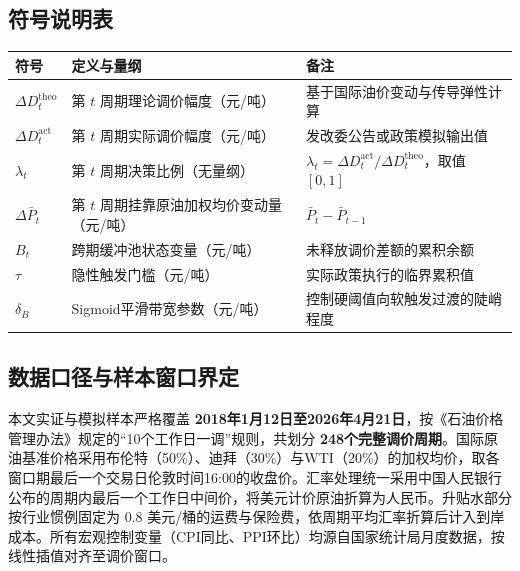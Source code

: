 \documentclass{mcmthesis}
\begin{document}
\subsection{ 符号说明表}
\begin{table}[htbp]
\centering
\begin{tabular}{l l l}
\toprule
符号 & 定义与量纲 & 备注 \\
\midrule
$\Delta D_t^{\text{theo}}$ & 第 $t$ 周期理论调价幅度（元/吨） & 基于国际油价变动与传导弹性计算 \\
$\Delta D_t^{\text{act}}$ & 第 $t$ 周期实际调价幅度（元/吨） & 发改委公告或政策模拟输出值 \\
$\lambda_t$ & 第 $t$ 周期决策比例（无量纲） & $\lambda_t = \Delta D_t^{\text{act}} / \Delta D_t^{\text{theo}}$，取值 $[0,1]$ \\
$\Delta \bar{P}_t$ & 第 $t$ 周期挂靠原油加权均价变动量（元/吨） & $\bar{P}_t - \bar{P}_{t-1}$ \\
$B_t$ & 跨期缓冲池状态变量（元/吨） & 未释放调价差额的累积余额 \\
$\tau$ & 隐性触发门槛（元/吨） & 实际政策执行的临界累积值 \\
$\delta_B$ & Sigmoid平滑带宽参数（元/吨） & 控制硬阈值向软触发过渡的陡峭程度 \\
\bottomrule
\end{tabular}
\end{table}

\subsection{ 数据口径与样本窗口界定}
本文实证与模拟样本严格覆盖 \textbf{2018年1月12日至2026年4月21日}，按《石油价格管理办法》规定的“10个工作日一调”规则，共划分 \textbf{248个完整调价周期}。国际原油基准价格采用布伦特（50\%）、迪拜（30\%）与WTI（20\%）的加权均价，取各窗口期最后一个交易日伦敦时间16:00的收盘价。汇率处理统一采用中国人民银行公布的周期内最后一个工作日中间价，将美元计价原油折算为人民币。升贴水部分按行业惯例固定为 $0.8$ 美元/桶的运费与保险费，依周期平均汇率折算后计入到岸成本。所有宏观控制变量（CPI同比、PPI环比）均源自国家统计局月度数据，按线性插值对齐至调价窗口。
\end{document}
